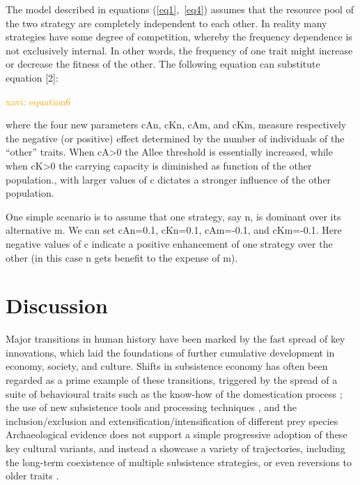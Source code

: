 \documentclass[preprint,authoryear]{elsarticle}
\newcommand{\memo}[2]{\textcolor{#1}{#2}}
\newcommand{\xavi}[1]{\memo{orange}{xavi: #1\\}}
\begin{document}
The model described in equations  (\ref{eq1},~\ref{eq4}) assumes that the resource pool of the two strategy are completely independent to each other. In reality many strategies have some degree of competition, whereby the frequency dependence is not exclusively internal. In other words, the frequency of one  trait might increase or decrease the fitness of the other. The following equation can substitute equation [2]: 

\xavi{equation6}

where the four new parameters cAn, cKn, cAm, and cKm, measure respectively the negative (or positive) effect determined by the number of individuals of the “other” traits. When cA>0 the Allee threshold is essentially increased, while when cK>0 the carrying capacity is diminished as function of the other population., with larger values of c dictates a stronger influence of the other population. 

One simple scenario is to assume that one strategy, say n, is dominant over its alternative m. We can  set cAn=0.1,  cKn=0.1,  cAm=-0.1, and  cKm=-0.1. Here negative values of c indicate a positive enhancement of one strategy over the other (in this case n gets benefit to the expense of m). 

\section{Discussion}

Major transitions in human history have been marked by the fast spread of key innovations, which laid the foundations of further cumulative development in economy, society, and culture. Shifts in subsistence economy has often been regarded as a prime example of these transitions, triggered by the spread of a suite of behavioural traits such as the know-how of the domestication process \citep{barker2006}; the use of new subsistence tools %
and processing techniques \citep{molleson1993}, and the inclusion/exclusion and extensification/intensification of different prey species %
Archaeological evidence does  not support a simple progressive adoption of these key cultural variants, and instead a showcase a variety of trajectories, including the long-term coexistence of multiple subsistence strategies, or even reversions to older traits \citep{rowley2001}.  
\end{document}
